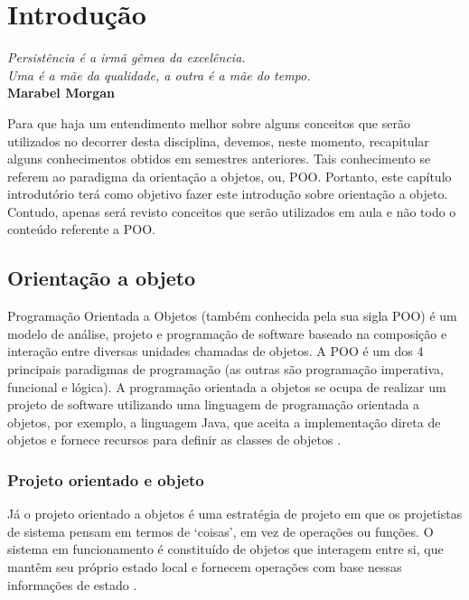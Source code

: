 \chapter{Introdução}

\begin{flushright}
  \textit{
    Persistência é a irmã gêmea da excelência. \\
    Uma é a mãe da qualidade, a outra é a mãe do tempo.
  } \\
  
  \textbf{Marabel Morgan}
\end{flushright}


Para que haja um entendimento melhor sobre alguns conceitos que serão utilizados no decorrer desta disciplina, devemos, neste momento, recapitular alguns conhecimentos obtidos em semestres anteriores. Tais conhecimento se referem ao paradigma da orientação a objetos, ou, POO. Portanto, este capítulo introdutório terá como objetivo fazer este introdução sobre orientação a objeto. Contudo, apenas será revisto conceitos que serão utilizados em aula e não todo o conteúdo referente a POO.

\section{Orientação a objeto}

Programação Orientada a Objetos (também conhecida pela sua sigla POO) é um 
modelo de análise, projeto e programação de software baseado na composição e 
interação entre diversas unidades chamadas de objetos. A POO é um dos 4 
principais paradigmas de programação (as outras são programação imperativa, 
funcional e lógica). A programação orientada a objetos se ocupa de realizar um projeto de software utilizando
uma linguagem de programação orientada a objetos, por exemplo, a linguagem Java, que
aceita a implementação direta de objetos e fornece recursos para definir as classes de
objetos \cite{sommerville2003engenharia}.

\subsection{Projeto orientado e objeto}

Já o projeto orientado a objetos é uma estratégia de projeto em que os projetistas de sistema
pensam em termos de ‘coisas’, em vez de operações ou funções. O sistema em funcionamento
é constituído de objetos que interagem entre si, que mantêm seu próprio estado local e fornecem
operações com base nessas informações de estado \cite{sommerville2003engenharia}.

